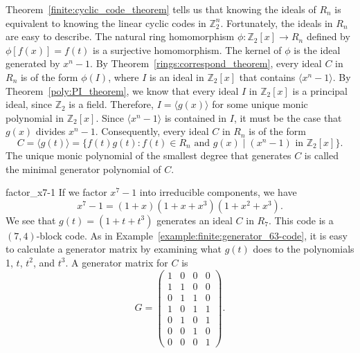 Theorem~\ref{finite:cyclic_code_theorem} tells us that knowing the ideals of $R_n$ is equivalent to knowing the linear cyclic codes in ${\mathbb Z}_2^n$.  Fortunately, the ideals in $R_n$ are easy to describe.  The  natural ring homomorphism $\phi : {\mathbb Z}_2[x] \rightarrow R_n$ defined by $\phi[f(x)] = f(t)$ is a surjective homomorphism.  The kernel of $\phi$ is the ideal generated by $x^n - 1$.  By Theorem~\ref{rings:correspond_theorem}, every ideal $C$ in $R_n$ is of the form $\phi(I)$, where $I$ is an ideal in ${\mathbb Z}_2[x]$ that contains $\langle x^n - 1 \rangle$.  By Theorem~\ref{poly:PI_theorem}, we know that every ideal $I$ in ${\mathbb Z}_2[x]$ is a principal ideal, since ${\mathbb Z}_2$ is a field. Therefore, $I = \langle g(x) \rangle$ for some unique monic polynomial in ${\mathbb Z}_2[x]$. Since $\langle x^n - 1 \rangle$ is contained in $I$, it must be the case that $g(x)$ divides $x^n - 1$. Consequently, every ideal $C$ in $R_n$ is of the form 
\[
C= \langle g(t) \rangle = \{ f(t)g(t) : f(t) \in R_n \mbox{ and $g(x)
\mid (x^n - 1)$ in } {\mathbb Z}_2[x] \}.
\] 
The unique monic polynomial of the smallest degree that generates $C$ is called the {\bfi minimal generator polynomial\/} of $C$. 


\begin{example}{factor_x7-1}
If we factor $x^7 - 1$ into irreducible components, we have
\[
x^7 - 1 = (1 + x)(1 + x + x^3)(1+ x^2 + x^3).
\]
We see that $g(t) = (1 + t + t^3)$ generates an ideal $C$ in $R_7$.  This code is a $(7, 4)$-block code.  As in Example~\ref{example:finite:generator_63-code}, it is easy to calculate a generator matrix by examining what $g(t)$ does to the polynomials 1, $t$, $t^2$, and $t^3$.  A generator matrix for $C$ is 
\[
G =
\begin{pmatrix}
1 & 0 & 0 & 0 \\
1 & 1 & 0 & 0 \\
0 & 1 & 1 & 0 \\
1 & 0 & 1 & 1 \\
0 & 1 & 0 & 1 \\
0 & 0 & 1 & 0 \\
0 & 0 & 0 & 1
\end{pmatrix}.
\]
\end{example}

